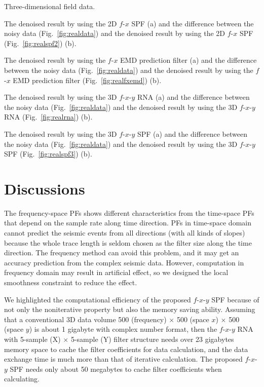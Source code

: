  {Three-dimensional field
  data.}

 { The
  denoised result by using the 2D $f$-$x$ SPF (a) and the difference
  between the noisy data (Fig.~\ref{fig:realdata}) and the denoised
  result by using the 2D $f$-$x$ SPF (Fig.~\ref{fig:realspf2}) (b).}

 {The
  denoised result by using the $f$-$x$ EMD prediction filter (a) and
  the difference between the noisy data (Fig.~\ref{fig:realdata}) and
  the denoised result by using the $f$-$x$ EMD prediction filter
  (Fig.~\ref{fig:realfxemd}) (b).}

 {The
  denoised result by using the 3D $f$-$x$-$y$ RNA (a) and the
  difference between the noisy data (Fig.~\ref{fig:realdata}) and the
  denoised result by using the 3D $f$-$x$-$y$ RNA
  (Fig.~\ref{fig:realrna}) (b).}

 {The
  denoised result by using the 3D $f$-$x$-$y$ SPF (a) and the
  difference between the noisy data (Fig.~\ref{fig:realdata}) and the
  denoised result by using the 3D $f$-$x$-$y$ SPF
  (Fig.~\ref{fig:realspf3}) (b).}

\section{Discussions}

The frequency-space PFs shows different characteristics from the
time-space PFs that depend on the sample rate along time direction.
PFs in time-space domain cannot predict the seismic events from all
directions (with all kinds of slopes) because the whole trace length
is seldom chosen as the filter size along the time direction.  The
frequency method can avoid this problem, and it may get an accuracy
prediction from the complex seismic data. However, computation in
frequency domain may result in artificial effect, so we designed the
local smoothness constraint to reduce the effect.

We highlighted the computational efficiency of the proposed
$f$-$x$-$y$ SPF because of not only the noniterative property but also
the memory saving ability. Assuming that a conventional 3D data volume
500 (frequency) $\times$ 500 (space $x$) $\times$ 500 (space $y$) is
about 1 gigabyte with complex number format, then the $f$-$x$-$y$ RNA
with 5-sample (X) $\times$ 5-sample (Y) filter structure needs over 23
gigabytes memory space to cache the filter coefficients for data
calculation, and the data exchange time is much more than that of
iterative calculation.  The proposed $f$-$x$-$y$ SPF needs only about
50 megabytes to cache filter coefficients when calculating.

